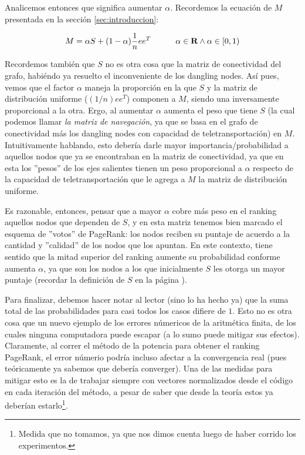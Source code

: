 \par Analicemos entonces que significa aumentar $\alpha$. Recordemos la
ecuaci\'on de $M$ presentada en la secci\'on \ref{sec:introduccion}:

\begin{equation*}
    M = \alpha S + (1-\alpha) \frac{1}{n}ee^T \quad\quad\quad \alpha\in\real
    \land \alpha\in\left[0,1\right) \label{eq:M_def}
\end{equation*}

\par Recordemos tambi\'en que $S$ no es otra cosa que la matriz de conectividad
del grafo, habi\'endo ya resuelto el inconveniente de los dangling nodes. As\'i
pues, vemos que el factor $\alpha$ maneja la proporci\'on en la que $S$ y la
matriz de distribuci\'on uniforme ($(1/n)ee^T$) componen a $M$, siendo una
inversamente proporcional a la otra. Ergo, al aumentar $\alpha$ aumenta el peso
que tiene $S$ (la cual podemos llamar \emph{la matriz de navegaci\'on}, ya que
se basa en el grafo de conectividad m\'as los dangling nodes con capacidad de
teletransportaci\'on) en $M$. Intuitivamente hablando, esto deber\'ia darle
mayor importancia/probabilidad a aquellos nodos que ya se encontraban en la
matriz de conectividad, ya que en esta los ''pesos'' de los ejes salientes
tienen un peso proporcional a $\alpha$ respecto de la capacidad de
teletransportaci\'on que le agrega a $M$ la matriz de distribuci\'on uniforme.

\par Es razonable, entonces, pensar que a mayor $\alpha$ cobre m\'as peso en el
ranking aquellos nodos que dependen de $S$, y en esta matriz tenemos bien
marcado el esquema de ''votos'' de PageRank: los nodos reciben su puntaje de
acuerdo a la cantidad y ''calidad'' de los nodos que los apuntan. En este
contexto, tiene sentido que la mitad superior del ranking aumente su
probabilidad conforme aumenta $\alpha$, ya que son los nodos a los que
inicialmente $S$ les otorga un mayor puntaje (recordar la definici\'on de $S$ en
la p\'agina \pageref{eq:S}).

\par Para finalizar, debemos hacer notar al lector (sino lo ha hecho ya) que la
suma total de las probabilidades para casi todos los casos difiere de $1$. Esto
no es otra cosa que un nuevo ejemplo de los errores n\'umericos de la
aritm\'etica finita, de los cuales ninguna computadora puede escapar (a lo sumo
puede mitigar sus efectos). Claramente, al correr el m\'etodo de la potencia
para obtener el ranking PageRank, el error n\'umerio podr\'ia incluso afectar a
la convergencia real (pues te\'oricamente ya sabemos que deber\'ia converger).
Una de las medidas para mitigar esto es la de trabajar siempre con vectores
normalizados desde el c\'odigo en cada iteraci\'on del m\'etodo, a pesar de
saber que desde la teor\'ia estos ya deber\'ian estarlo\footnote{Medida que no
tomamos, ya que nos dimos cuenta luego de haber corrido los experimentos.}.

